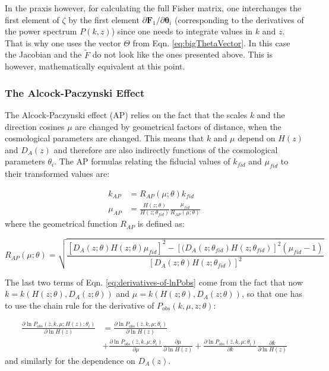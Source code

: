 In the praxis however, for calculating the full Fisher matrix, one
interchanges the first element of $\zeta$ by the first element $\partial\boldsymbol{F}_{1}/\partial\boldsymbol{\theta}_{i}$
(corresponding to the derivatives of the power spectrum $P(k,z)$)
since one needs to integrate values in $k$ and $z$. That is why
one uses the vector $\Theta$ from Eqn. \ref{eq:bigThetaVector}.
In this case the Jacobian and the $\tilde{F}$ do not look like the
ones presented above. This is however, mathematically equivalent at
this point.


\subsubsection{The Alcock-Paczynski Effect\label{sub:The-Alcock-Paczynski-Effect}}

The Alcock-Paczynski effect (AP) relies on the fact that the scales
$k$ and the direction cosines $\mu$ are changed by geometrical factors
of distance, when the cosmological parameters are changed. This means
that $k$ and $\mu$ depend on $H(z)$ and $D_{A}(z)$ and therefore
are also indirectly functions of the cosmological parameters $\theta_{i}$.
The AP formulas relating the fiducial values of $k_{fid}$ and $\mu_{fid}$
to their transformed values are:

\begin{align}
k_{AP} & =R_{AP}(\mu;\theta)k_{fid}\\
\mu_{AP} & =\frac{H(z;\theta)}{H(z;\theta_{fid})}\frac{\mu_{fid}}{R_{AP}(\mu;\theta)}
\end{align}
where the geometrical function $R_{AP}$ is defined as:

\begin{equation}
R_{AP}(\mu;\theta)=\sqrt{\frac{[D_{A}(z;\theta)H(z;\theta)\mu_{fid}]^{2}-[(D_{A}(z;\theta_{fid})H(z;\theta_{fid})]^{2}(\mu_{fid}-1)}{[D_{A}(z;\theta)H(z;\theta_{fid})]^{2}}}
\end{equation}


The last two terms of Eqn. \ref{eq:derivatives-of-lnPobs} come from
the fact that now $k=k(H(z;\theta),D_{A}(z;\theta))$ and $\mu=k(H(z;\theta),D_{A}(z;\theta))$,
so that one has to use the chain rule for the derivative of $P_{obs}(k,\mu,z;\theta)$:

\begin{align}
\frac{\partial\ln P_{obs}\left(\bar{z},k,\mu;H(z);\theta_{i}\right)}{\partial\ln H(z)} & =\frac{\partial\ln P_{obs}\left(\bar{z},k,\mu;\theta_{i}\right)}{\partial\ln H(z)}\\
& +\frac{\partial\ln P_{obs}\left(\bar{z},k,\mu;\theta_{i}\right)}{\partial\mu}\frac{\partial\mu}{\partial\ln H(z)}+\frac{\partial\ln P_{obs}\left(\bar{z},k,\mu;\theta_{i}\right)}{\partial k}\frac{\partial k}{\partial\ln H(z)}\nonumber 
\end{align}
and similarly for the dependence on $D_{A}(z)$.

